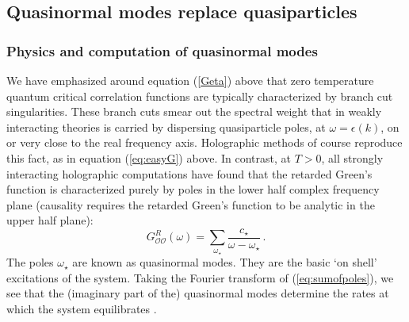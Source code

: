 \documentclass[10pt, oneside]{book}
\def\be{\begin{equation}}
\def\ee{\end{equation}}
\def\ocal{{\mathcal{O}}}
\begin{document}
\begin{doublespace}


\subsection{Quasinormal modes replace quasiparticles}
\label{sec:quasinormal}

\subsubsection{Physics and computation of quasinormal modes}

We have emphasized around equation (\ref{Geta}) above that zero temperature quantum critical correlation functions are typically characterized by branch cut singularities. These branch cuts smear out the spectral weight that in weakly interacting theories is carried by dispersing quasiparticle poles, at $\omega = \epsilon(k)$, on or very close to the real frequency axis. Holographic methods of course reproduce this fact, as in equation (\ref{eq:easyG}) above. In contrast, at $T>0$, all strongly interacting holographic computations have found that the retarded Green's function is characterized purely by poles in the lower half complex frequency plane (causality requires the retarded Green's function to be analytic in the upper half plane):
\be\label{eq:sumofpoles}
G^{R}_{\ocal\ocal}(\omega) = \sum_{\omega_\star} \frac{c_\star}{\omega - \omega_\star} \,.
\ee
The poles $\omega_\star$ are known as quasinormal modes. They are the basic `on shell' excitations of the system. Taking the Fourier transform of (\ref{eq:sumofpoles}), we see that the (imaginary part of the) quasinormal modes determine the rates at which the system equilibrates \cite{Horowitz:1999jd}.


\end{doublespace}
\end{document}
